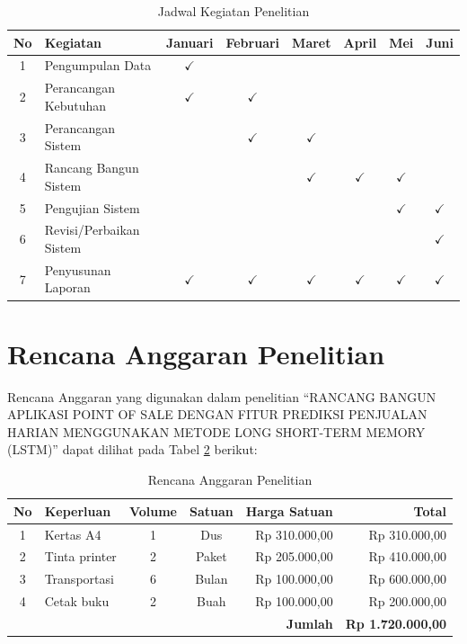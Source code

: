 \begin{table}[htbp]
    \centering
    \caption{Jadwal Kegiatan Penelitian}
    \label{tab:jadwal}
    \fontsize{10pt}{12pt}\selectfont
    \begin{tabular}{|c|l|c|c|c|c|c|c|}
        \hline
        \textbf{No} & \textbf{Kegiatan} & \textbf{Januari} & \textbf{Februari} & \textbf{Maret} & \textbf{April} & \textbf{Mei} & \textbf{Juni} \\
        \hline
        1 & Pengumpulan Data & $\checkmark$ & & & & & \\
        \hline
        2 & Perancangan Kebutuhan & $\checkmark$ & $\checkmark$ & & & & \\
        \hline
        3 & Perancangan Sistem & & $\checkmark$ & $\checkmark$ & & & \\
        \hline
        4 & Rancang Bangun Sistem & & & $\checkmark$ & $\checkmark$ & $\checkmark$ & \\
        \hline
        5 & Pengujian Sistem & & & & & $\checkmark$ & $\checkmark$ \\
        \hline
        6 & Revisi/Perbaikan Sistem & & & & & & $\checkmark$ \\
        \hline
        7 & Penyusunan Laporan & $\checkmark$ & $\checkmark$ & $\checkmark$ & $\checkmark$ & $\checkmark$ & $\checkmark$ \\
        \hline
    \end{tabular}
\end{table}

\section{Rencana Anggaran Penelitian}
Rencana Anggaran yang digunakan dalam penelitian “RANCANG BANGUN APLIKASI POINT OF SALE DENGAN FITUR PREDIKSI PENJUALAN HARIAN MENGGUNAKAN METODE LONG SHORT-TERM MEMORY (LSTM)” dapat dilihat pada Tabel \ref{tab:anggaran} berikut:

\begin{table}[htbp]
    \centering
    \caption{Rencana Anggaran Penelitian}
    \label{tab:anggaran}
    \fontsize{10pt}{12pt}\selectfont
    \begin{tabular}{|c|l|c|c|r|r|}
        \hline
        \textbf{No} & \textbf{Keperluan} & \textbf{Volume} & \textbf{Satuan} & \textbf{Harga Satuan} & \textbf{Total} \\
        \hline
        1 & Kertas A4 & 1 & Dus & Rp 310.000,00 & Rp 310.000,00 \\
        \hline
        2 & Tinta printer & 2 & Paket & Rp 205.000,00 & Rp 410.000,00 \\
        \hline
        3 & Transportasi & 6 & Bulan & Rp 100.000,00 & Rp 600.000,00 \\
        \hline
        4 & Cetak buku & 2 & Buah & Rp 100.000,00 & Rp 200.000,00 \\
        \hline
        \multicolumn{5}{|r|}{\textbf{Jumlah}} & \textbf{Rp 1.720.000,00} \\
        \hline
    \end{tabular}
\end{table}